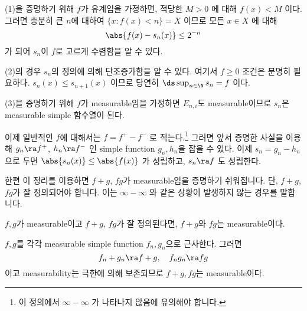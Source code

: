 (1)을 증명하기 위해 \(f\)가 유계임을 가정하면, 적당한 \(M > 0\) 에 대해 \(f(x) < M\) 이다. 그러면 충분히 큰 \(n\)에 대하여 \(\{x : f(x) < n\} = X\) 이므로 모든 \(x \in X\) 에 대해
\[
    \abs{f(x) - s_n(x)} \leq 2^{-n}
\]
가 되어 \(s_n\)이 \(f\)로 고르게 수렴함을 알 수 있다.

(2)의 경우 \(s_n\)의 정의에 의해 단조증가함을 알 수 있다. 여기서 \(f \geq 0\) 조건은 분명히 필요하다. \(s_n(x) \leq s_{n+1}(x)\) 이므로 당연히 \(\ds \sup_{n\in \N} s_n = f\) 이다.

(3)을 증명하기 위해 \(f\)가 measurable임을 가정하면 \(E_{n, i}\)도 measurable이므로 \(s_n\)은 measurable simple 함수열이 된다.

이제 일반적인 \(f\)에 대해서는 \(f = f^+ - f^-\) 로 적는다.\footnote{이 정의에서 \(\infty - \infty\) 가 나타나지 않음에 유의해야 합니다.} 그러면 앞서 증명한 사실을 이용해 \(g_n \ra f^+\), \(h_n \ra f^-\) 인 simple function \(g_n, h_n\)을 잡을 수 있다. 이제 \(s_n = g_n - h_n\) 으로 두면 \(\abs{s_n(x)} \leq \abs{f(x)}\) 가 성립하고, \(s_n \ra f\) 도 성립한다.

한편 이 정리를 이용하면 \(f + g\), \(fg\)가 measurable임을 증명하기 쉬워집니다. 단, \(f+g\), \(fg\)가 잘 정의되어야 합니다. 이는 \(\infty - \infty\) 와 같은 상황이 발생하지 않는 경우를 말합니다.

\cor \(f, g\)가 measurable이고 \(f + g\), \(fg\)가 잘 정의된다면, \(f+g\)와 \(fg\)는 measurable이다.

\pf \(f, g\)를 각각 measurable simple function \(f_n, g_n\)으로 근사한다. 그러면
\[
    f_n + g_n \ra f + g, \quad f_ng_n \ra fg
\]
이고 measurability는 극한에 의해 보존되므로 \(f+g, fg\)는 measurable이다.

\pagebreak
